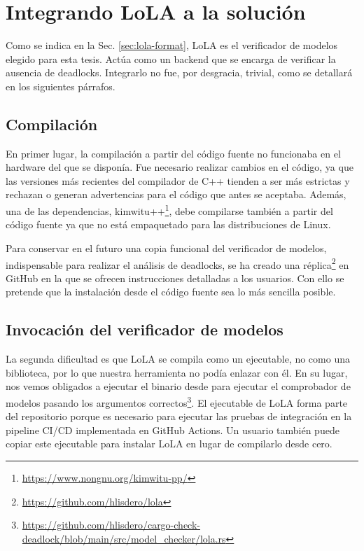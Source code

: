 \section{Integrando LoLA a la solución}

Como se indica en la Sec. \ref{sec:lola-format},
\acrshort{LoLA}  es el verificador de modelos elegido para esta tesis.
Actúa como un backend que se encarga de verificar la ausencia de deadlocks.
Integrarlo no fue, por desgracia, trivial, como se detallará en los siguientes párrafos.

\subsection{Compilación}

En primer lugar, la compilación a partir del código fuente no funcionaba en el hardware del que
se disponía. Fue necesario realizar cambios en el código, ya que las versiones más recientes
del compilador de C++ tienden a ser más estrictas y rechazan o generan advertencias para el
código que antes se aceptaba. Además, una de las dependencias, kimwitu++\footnote{\url{https://www.nongnu.org/kimwitu-pp/}},
debe compilarse también a partir del código fuente ya que no está empaquetado para las distribuciones de Linux.

Para conservar en el futuro una copia funcional del verificador de modelos, indispensable
para realizar el análisis de deadlocks, se ha creado
una réplica\footnote{\url{https://github.com/hlisdero/lola}} en GitHub
en la que se ofrecen instrucciones detalladas a los usuarios.
Con ello se pretende que la instalación desde el código fuente sea lo más sencilla posible.

\subsection{Invocación del verificador de modelos}

La segunda dificultad es que \acrshort{LoLA} se compila como un ejecutable, no como una biblioteca,
por lo que nuestra herramienta no podía enlazar con él. En su lugar, nos vemos obligados a
ejecutar el binario desde  para ejecutar el comprobador de modelos
pasando los argumentos correctos\footnote{\url{https://github.com/hlisdero/cargo-check-deadlock/blob/main/src/model_checker/lola.rs}}.
El ejecutable de \acrshort{LoLA} forma parte del repositorio porque es
necesario para ejecutar las pruebas de integración en la pipeline CI/CD implementada en GitHub Actions.
Un usuario también puede copiar este ejecutable para instalar \acrshort{LoLA} en lugar de compilarlo desde cero.

